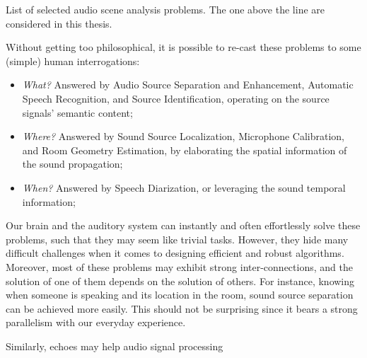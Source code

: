 \begin{table}[!h]

    \begin{fullwidth}
    \centering
    \small

    
    \caption{List of selected audio scene analysis problems. The one above the line are considered in this thesis.}
    \label{tab:processing:problems}

    \end{fullwidth}

\end{table}

\mynewline
Without getting too philosophical, it is possible to re-cast these problems to some (simple) human interrogations:
\begin{itemize}
    \item  \textit{What?} Answered by Audio Source Separation and Enhancement, Automatic Speech Recognition, and Source Identification, operating on the source signals' semantic content;
    \item  \textit{Where?} Answered by Sound Source Localization, Microphone Calibration, and Room Geometry Estimation, by elaborating the spatial information of the sound propagation;
    \item  \textit{When?} Answered by Speech Diarization, or leveraging the sound temporal information;
\end{itemize}

\noindent Our
brain and the auditory system can instantly and often effortlessly solve these problems, such that they may seem like trivial tasks.
However, they hide many difficult challenges when it comes to designing efficient and robust algorithms.
Moreover, most of these problems may exhibit strong inter-connections, and the solution of one of them depends on the solution of others.
For instance, knowing when someone is speaking and its location in the room, sound source separation can be achieved more easily.
This should not be surprising since it bears a strong parallelism with our everyday experience.

\mynewline
Similarly, echoes may help audio signal processing

